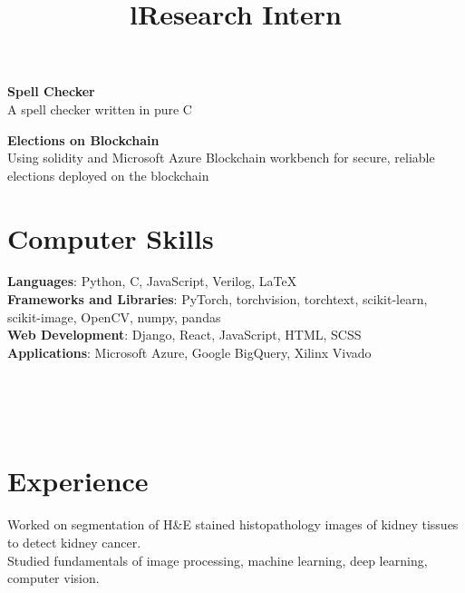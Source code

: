\documentclass[margin]{res}
\begin{document}
\begin{resume}
      \par
      \textbf{Spell Checker}\\
      A spell checker written in pure C

      \par
      \textbf{Elections on Blockchain}\\
      Using solidity and Microsoft Azure Blockchain workbench for secure, reliable elections deployed on the blockchain

    \section{Computer Skills}
      \textbf{Languages}: Python, C, JavaScript, Verilog, \LaTeX
      \\
      \textbf{Frameworks and Libraries}: PyTorch, torchvision, torchtext, scikit-learn, scikit-image, OpenCV, numpy, pandas
      \\
      \textbf{Web Development}: Django, React, JavaScript, HTML, SCSS
      \\
      \textbf{Applications}: Microsoft Azure, Google BigQuery, Xilinx Vivado


    \begin{format}
      \title{l}\\
      \\
      \body\\
    \end{format}

    \section{Experience}
      \title{\textbf{Research Intern}}
      \begin{position}
        Worked on segmentation of H\&E stained histopathology images of kidney tissues to detect kidney cancer.\\
        Studied fundamentals of image processing, machine learning, deep learning, computer vision.
      \end{position}


\end{resume}
\end{document}
